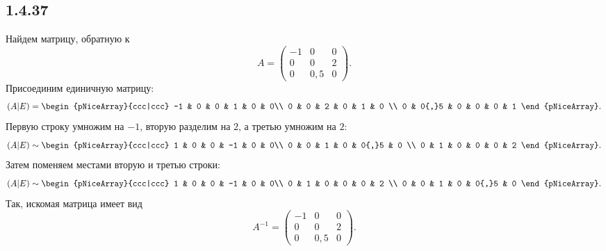\subsection{1.4.37}

Найдем матрицу, обратную к
\[
A=
\begin{pmatrix}
	-1 & 0 & 0 \\
	0 & 0 & 2 \\
	0 & 0{,}5 & 0
\end{pmatrix}
.
\]
Присоединим единичную матрицу:
\[
(A|E)=
\begin{pNiceArray}{ccc|ccc}
	-1 & 0 & 0 & 1 & 0 & 0\\
	0 & 0 & 2 & 0 & 1 & 0 \\
	0 & 0{,}5 & 0 & 0 & 0 & 1
\end{pNiceArray}.
\]
Первую строку умножим на $-1$, вторую разделим на $2$, а третью умножим на $2$:
\[
(A|E)\sim
\begin{pNiceArray}{ccc|ccc}
	1 & 0 & 0 & -1 & 0 & 0\\
	0 & 0 & 1 & 0 & 0{,}5 & 0 \\
	0 & 1 & 0 & 0 & 0 & 2
\end{pNiceArray}.
\]
Затем поменяем местами вторую и третью строки:
\[
(A|E)\sim
\begin{pNiceArray}{ccc|ccc}
	1 & 0 & 0 & -1 & 0 & 0\\
	0 & 1 & 0 & 0 & 0 & 2 \\
	0 & 0 & 1 & 0 & 0{,}5 & 0
\end{pNiceArray}.
\]
Так, искомая матрица имеет вид
\[
A^{-1}=
\begin{pmatrix}
	-1 & 0 & 0\\
	0 & 0 & 2 \\
	0 & 0{,}5 & 0
\end{pmatrix}.
\]